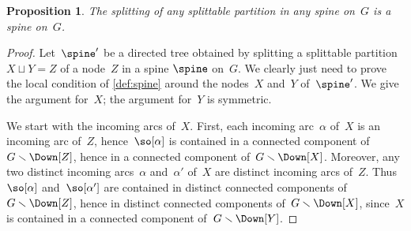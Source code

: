 \documentclass{amsart}
\newtheorem{proposition}[theorem]{Proposition}
\theoremstyle{definition}
\newtheorem{remark}[theorem]{Remark}
\newcommand{\ssm}{\smallsetminus} %
\begin{document}
\begin{proposition}
  \label{prop:nodeSplitting} 
  The splitting of any splittable partition in any spine on~$G$ is a spine on~$G$.
\end{proposition}


\begin{proof}
  Let~$\spine'$ be a directed tree obtained by splitting a splittable partition~$X \sqcup Y = Z$ of a node~$Z$ in a spine $\spine$ on~$G$.
  We clearly just need to prove the local condition of \cref{def:spine} around the nodes~$X$ and~$Y$ of~$\spine'$.
  We give the argument for~$X$; the argument for~$Y$ is symmetric.
  
  We start with the incoming arcs of~$X$.
  First, each incoming arc~$\alpha$ of~$X$ is an incoming arc of~$Z$, hence~$\so[\alpha]$ is contained in a connected component of~$G \ssm \Down[Z]$, hence in a connected component of~$G \ssm \Down[X]$.
  Moreover, any two distinct incoming arcs~$\alpha$ and~$\alpha'$ of~$X$ are distinct incoming arcs of~$Z$. Thus~$\so[\alpha]$ and~$\so[\alpha']$ are contained in distinct connected components of~$G \ssm \Down[Z]$, hence in distinct connected components of~$G \ssm \Down[X]$, since~$X$ is contained in a connected component of~$G \ssm \Down[Y]$.


\end{proof}
\end{document}
